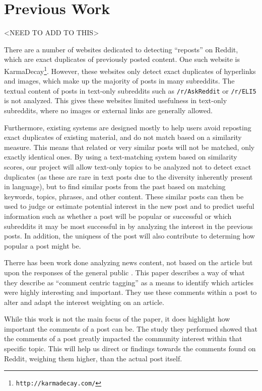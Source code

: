 \documentclass{acm_proc_article-sp}
\begin{document}
\section{Previous Work}
<NEED TO ADD TO THIS>

There are a number of websites dedicated to detecting ``reposts'' on Reddit, which are
exact duplicates of previously posted content.  One such website is KarmaDecay\footnote{\texttt{http://karmadecay.com/}}.
However, these websites only detect exact duplicates of hyperlinks and images, which make
up the majority of posts in many subreddits.  The textual content of posts in text-only
subreddits such as \texttt{/r/AskReddit} or \texttt{/r/ELI5} is not analyzed.
This gives these websites limited usefulness in text-only subreddits, where no images or external
links are generally allowed.

Furthermore, existing systems are designed mostly to help users avoid reposting exact duplicates of
existing material, and do not match based on a similarity measure.  This means that related or
very similar posts will not be matched, only exactly identical ones.  By using a text-matching system based
on similarity scores,
our project will allow text-only topics to be analyzed not to detect exact duplicates (as these
are rare in text posts due to the diversity inherently present in language), but to find similar
posts from the past based on matching keywords, topics, phrases, and other
content.  These similar posts can then be used to judge or estimate potential interest in the new
post and to predict useful information such as whether a post will be popular or successful or
which subreddits it may be most successful in by analyzing the interest in the previous posts. 
In addition, the uniqness of the post will also contribute to determing how popular a post might be.

Therre has been work done analyzing news content, not based on the article but
upon the responses of the general public \cite{liu:interest}. This paper describes
a way of what they describe as ``comment centric tagging'' as a means to identify
which articles were highly interesting and important. They use these comments within
a post to alter and adapt the interest weighting on an article. 

While this work is not the main focus of the paper, it does highlight how important
the comments of a post can be. The study they performed showed that the comments 
of a post greatly impacted the community interest within that specific topic. This will
help us direct or findings towards the comments found on Reddit, weighing them higher,
than the actual post itself.
\end{document}
